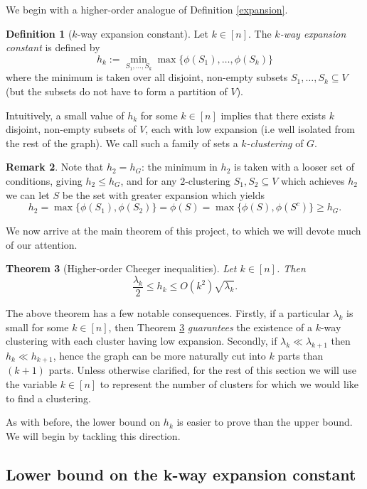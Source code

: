 \documentclass[a4paper,11pt]{article}
\newtheorem{theorem}{Theorem}[section]
\theoremstyle{definition}
\newtheorem{definition}[theorem]{Definition}
\newtheorem{remark}[theorem]{Remark}
\begin{document}
We begin with a higher-order analogue of Definition \ref{expansion}.
\begin{definition}[$k$-way expansion constant]Let $k \in [n]$. The \emph{$k$-way expansion constant} is defined by \[
h_k := \min_{S_1, \dots, S_k} \max \{\phi(S_1), \dots, \phi(S_k)\}
\] where the minimum is taken over all disjoint, non-empty subsets $S_1, \dots, S_k \subseteq V$ (but the subsets do not have to form a partition of $V$). \end{definition}
Intuitively, a small value of $h_k$ for some $k \in [n]$ implies that there exists $k$ disjoint, non-empty subsets of $V$, each with low expansion (i.e well isolated from the rest of the graph). We call such a family of sets a \emph{$k$-clustering} of $G$.

\medskip

\begin{remark}
Note that $h_2 = h_G$: the minimum in $h_2$ is taken with a looser set of conditions, giving $h_2 \le h_G$, and for any $2$-clustering $S_1, S_2 \subseteq V$ which achieves $h_2$ we can let $S$ be the set with greater expansion which yields \[h_2 = \max\{\phi(S_1), \phi(S_2)\} = \phi(S) = \max\{\phi(S), \phi(S^c)\} \ge h_G.\]
\end{remark}

We now arrive at the main theorem of this project, to which we will devote much of our attention.
\begin{theorem}[Higher-order Cheeger inequalities]\label{ho-cheeger}
Let $k \in [n]$. Then \[\frac{\lambda_k}{2} \le h_k \le O(k^2)\sqrt{\lambda_k}.\]
\end{theorem}

The above theorem has a few notable consequences. Firstly, if a particular $\lambda_k$ is small for some $k \in [n]$, then Theorem \ref{ho-cheeger} \emph{guarantees} the existence of a $k$-way clustering with each cluster having low expansion. Secondly, if $\lambda_k \ll \lambda_{k+1}$ then $h_k \ll h_{k+1}$, hence the graph can be more naturally cut into $k$ parts than $(k+1)$ parts. Unless otherwise clarified, for the rest of this section we will use the variable $k \in [n]$ to represent the number of clusters for which we would like to find a clustering.

As with before, the lower bound on $h_k$ is easier to prove than the upper bound. We will begin by tackling this direction.

\subsection{Lower bound on the k-way expansion constant}\label{ho-cheeger-lower-bound-section}
\end{document}
